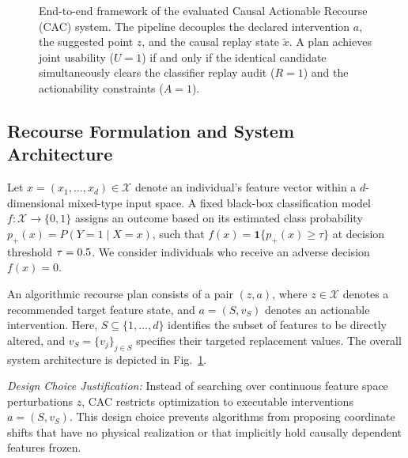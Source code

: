 \documentclass[nolineno]{paper/ieee-access/ieeeaccess}%
\newcommand{\CAC}{CAC}
\newcommand{\ind}{\ensuremath{\mathbf{1}}}
\begin{document}
\begin{figure}[t]
\caption{End-to-end framework of the evaluated Causal Actionable Recourse (CAC) system. The pipeline decouples the declared intervention $a$, the suggested point $z$, and the causal replay state $\widetilde{x}$. A plan achieves joint usability ($U=1$) if and only if the identical candidate simultaneously clears the classifier replay audit ($R=1$) and the actionability constraints ($A=1$).}
\label{fig:framework}
\end{figure}

\subsection{Recourse Formulation and System Architecture}
Let $x = (x_1, \dots, x_d) \in \mathcal{X}$ denote an individual's feature vector within a $d$-dimensional mixed-type input space. A fixed black-box classification model $f: \mathcal{X} \to \{0, 1\}$ assigns an outcome based on its estimated class probability $p_+(x) = P(Y=1 \mid X=x)$, such that $f(x) = \ind\{p_+(x) \ge \tau\}$ at decision threshold $\tau = 0.5$. We consider individuals who receive an adverse decision $f(x)=0$.

An algorithmic recourse plan consists of a pair $(z, a)$, where $z \in \mathcal{X}$ denotes a recommended target feature state, and $a = (S, v_S)$ denotes an actionable intervention. Here, $S \subseteq \{1, \dots, d\}$ identifies the subset of features to be directly altered, and $v_S = \{v_j\}_{j \in S}$ specifies their targeted replacement values. The overall system architecture is depicted in Fig.~\ref{fig:framework}.

\emph{Design Choice Justification:} Instead of searching over continuous feature space perturbations $z$, \CAC{} restricts optimization to executable interventions $a=(S, v_S)$. This design choice prevents algorithms from proposing coordinate shifts that have no physical realization or that implicitly hold causally dependent features frozen.
\end{document}
